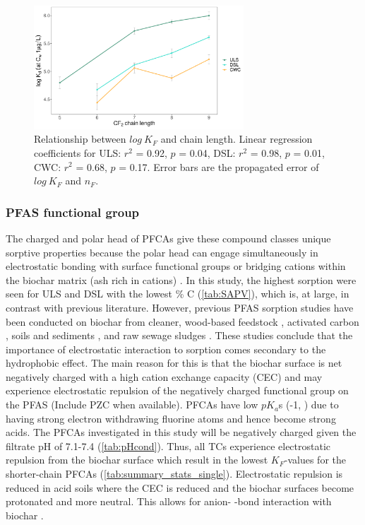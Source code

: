 \begin{figure}[tbh]
    \centering
    \includegraphics[width=0.7\textwidth]{R/figs/chain_length_Kd1ugL_plot.pdf}
    \caption{Relationship between $log~K_F$ and chain length. Linear regression coefficients for ULS: $r^2$ = 0.92, $p$ = 0.04, DSL: $r^2$ = 0.98, $p$ = 0.01, CWC: $r^2$ = 0.68, $p$ = 0.17. Error bars are the propagated error of $log~K_F$ and $n_F$.}
    \label{fig:chainlength}
\end{figure}

\subsubsection{PFAS functional group} 
The charged and polar head of PFCAs give these compound classes unique sorptive properties because the polar head can engage simultaneously in electrostatic bonding with surface functional groups or bridging cations within the biochar matrix (ash rich in cations) \citep{zhang2013sorption,sigmund2022sorption}. In this study, the highest sorption were seen for ULS and DSL with the lowest \% C (\cref{tab:SAPV}), which is, at large, in contrast with previous literature. However, previous PFAS sorption studies have been conducted on biochar from cleaner, wood-based feedstock \citep{Sormo2021}, activated carbon \citep{zhang2021sorption,Kupryianchyk2016b}, soils and sediments \citep{higgins2006sorption}, and raw sewage sludges \citep{zhang2013sorption}. These studies conclude that the importance of electrostatic interaction to sorption comes secondary to the hydrophobic effect. The main reason for this is that the biochar surface is net negatively charged with a high cation exchange capacity (CEC) \citep{Ahmad2014} and may experience electrostatic repulsion of the negatively charged functional group on the PFAS (Include PZC when available). PFCAs have low $pK_a$s (-1, \citep{goss2008pKa}) due to having strong electron withdrawing fluorine atoms and hence become strong acids. The PFCAs investigated in this study will be negatively charged given the filtrate pH of 7.1-7.4 (\cref{tab:pHcond}). Thus, all TCs experience electrostatic repulsion from the biochar surface which result in the lowest $K_F$-values for the shorter-chain PFCAs (\cref{tab:summary_stats_single}). Electrostatic repulsion is reduced in acid soils where the CEC is reduced and the biochar surfaces become protonated and more neutral. This allows for anion- \textpi-bond interaction with biochar \citep{sigmund2022sorption}. 

